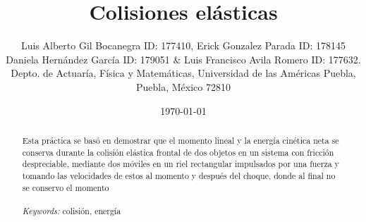 \documentclass{article}
\begin{document}

\renewcommand{\footrulewidth}{1pt}
\renewcommand{\tablename}{Tabla}
\renewcommand{\figurename}{Figura}


\title{Colisiones elásticas}
\author{\small{Luis Alberto Gil Bocanegra ID: 177410, Erick Gonzalez Parada ID: 178145}\\
 \small{Daniela Hernández García ID: 179051 $\&$ Luis Francisco Avila Romero ID: 177632.}\\		%
	   \small{Depto. de Actuaría, Física y Matemáticas, Universidad de las Américas Puebla, Puebla, M\'exico 72810}}
\date{\small{\today}}

\maketitle


\begin{abstract}
	Esta práctica se basó en demostrar que el momento lineal y la energía cinética
neta se conserva durante la colisión elástica frontal de dos objetos en un sistema con
fricción despreciable, mediante dos móviles en un riel rectangular impulsados por una
fuerza y tomando las velocidades de estos al momento y después del choque, donde al final no se conservo el momento	
\\
\\
{\it Keywords:}  colisión, energía  
\\
\\
\end{abstract}
\end{document}

